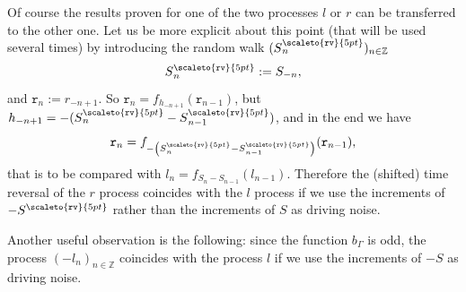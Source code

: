\documentclass[AHL,Unicode,longabstracts,published]{cedram}
\newcommand{\bbZ}{\mathbb{Z}}
\newcommand{\gG}{\Gamma}
\newcommand\mystrut{\rule{0pt}{6pt}}
\newcommand{\Srev}{S\mystrut^{\scaleto{\mathtt{rv}\mathstrut}{5pt}}}
\newcommand{\ttr}{\mathtt{r}}
\begin{document}
\begin{rema}\label{rem:time-reversal}
Of course the results proven for one of the two processes $l$ or $r$ can be transferred to the other one. Let us be more explicit about this point (that will be used several times) by introducing the random walk $(\Srev_n)_{n \in \bbZ}$
\begin{equation}\label{eq:Srev}
\Srev_n:= S_{-n},
\end{equation}
and $\ttr_{n}:= r_{-n+1}$. So $\ttr_n =f_{h_{-n+1}}(\ttr_{n-1})$, but $h_{-n+1}= -(
\Srev_n -\Srev_{n-1} )$, and in the end we have
\begin{equation}
\ttr_n = f_{ -\left(
\Srev_n -\Srev_{n-1} \right)}(\ttr_{n-1}),
\end{equation}
that is to be compared with $l_{n}= f_{S_n-S_{n-1}}(l_{n-1})$. Therefore the (shifted) time reversal of the $r$ process coincides with the $l$ process if we use the increments of $-\Srev$ rather than the increments of $S$ as driving noise.

Another useful observation is the following: since the function $b_\gG$ is odd, the process $(-l_n)_{n\in\bbZ}$ coincides with the process $l$ if we use the increments of $-S$ as driving noise.
\end{rema}
\end{document}
